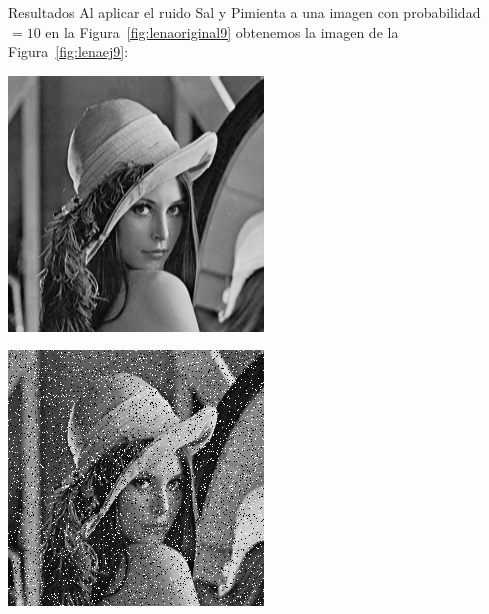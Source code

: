 \documentclass{beamer}
\begin{document}
\begin{frame}[fragile]{Resultados}
	\justifying
	Al aplicar el ruido Sal y Pimienta a una imagen con probabilidad $=10$ en la Figura~\ref{fig:lenaoriginal9} obtenemos la imagen de la Figura~\ref{fig:lenaej9}:
	\vspace{0.5cm}
	
	\centering
	\begin{minipage}{0.45\linewidth}
		\centering
		\includegraphics[width=\linewidth]{../results/lena_original}
		\label{fig:lenaoriginal9}
	\end{minipage}\hfill
	\begin{minipage}{0.45\linewidth}
		\centering
		\includegraphics[width=\linewidth]{../results/lena_ej9}

\end{minipage}
\end{frame}
\end{document}
